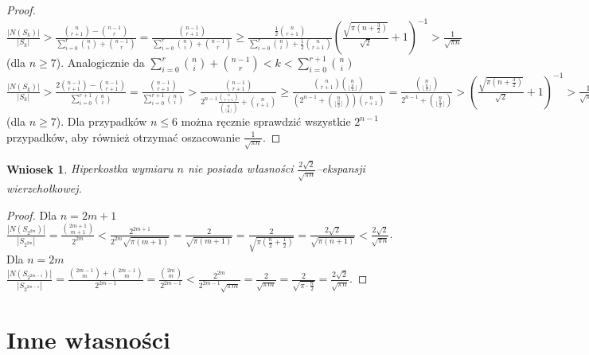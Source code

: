 \documentclass{pracamgr}
\newtheorem{corollary}[theorem]{Wniosek}
\begin{document}
\begin{proof}
    $\frac{|N(S_k)|}{|S_k|}>\frac{{n\choose r+1}-{n-1\choose r}}{\sum_{i=0}^{r}{n\choose i}+{n-1 \choose r}}=
    \frac{{n-1\choose r+1}}{\sum_{i=0}^{r}{n\choose i}+{n-1 \choose r}}\ge
    \frac{\frac{1}{2}{n \choose r+1}}{\sum_{i=0}^{r}{n\choose i}+\frac{1}{2}{n \choose r+1}}
    \left(\frac{\sqrt{\pi (n+\frac{3}{2})}}{\sqrt{2}}+1\right)^{-1}>\frac{1}{\sqrt{\pi n}}$ (dla $n\ge 7$).\newline
    Analogicznie da $\sum_{i=0}^{r}{n\choose i}+{n-1 \choose r}<k<\sum_{i=0}^{r+1}{n\choose i}$\newline
    $\frac{|N(S_k)|}{|S_k|}>\frac{2{n-1\choose r+1}-{n-1\choose r+1}}{\sum_{i=0}^{r+1}{n\choose i}}=
    \frac{{n-1\choose r+1}}{\sum_{i=0}^{r+1}{n\choose i}}>
    \frac{{n-1\choose r+1}}{2^{n-1}\frac{{n\choose r+1}}{{n\choose\lfloor\frac{n}{2}\rfloor}}+{n\choose r+1}}\ge
    \frac{{n\choose r+1}{n\choose\lfloor\frac{n}{2}\rfloor}}{(2^{n-1}+{n\choose\lfloor\frac{n}{2}\rfloor}){n\choose r+1}}=
    \frac{{n\choose\lfloor\frac{n}{2}\rfloor}}{2^{n-1}+{n\choose\lfloor\frac{n}{2}\rfloor}}>
    \left(\frac{\sqrt{\pi (n+\frac{3}{2})}}{\sqrt{2}}+1\right)^{-1}>\frac{1}{\sqrt{\pi n}}$ (dla $n\ge 7$).\newline
    Dla przypadków $n\le6$ można ręcznie sprawdzić wszystkie $2^{n-1}$ przypadków, aby również otrzymać oszacowanie $\frac{1}{\sqrt{\pi n}}$.
   \end{proof}
   \begin{corollary}\label{ograniczenie ekspansji}
    Hiperkostka wymiaru $n$ nie posiada własności $\frac{2\sqrt{2}}{\sqrt{\pi n}}$--ekspansji wierzchołkowej.
   \end{corollary}
   \begin{proof}
    Dla $n=2m+1$\newline
    $\frac{|N(S_{2^{2m}})|}{|S_{2^{2m}}|}=\frac{{2m+1 \choose m+1}}{2^{2m}}<\frac{2^{2m+1}}{2^{2m}\sqrt{\pi(m+1)}}=\frac{2}{\sqrt{\pi(m+1)}}=
    \frac{2}{\sqrt{\pi(\frac{n}{2}+\frac{1}{2})}}=\frac{2\sqrt{2}}{\sqrt{\pi(n+1)}}<\frac{2\sqrt{2}}{\sqrt{\pi n}}$.\newline
    Dla $n=2m$
    $\frac{|N(S_{2^{2m-1}})|}{|S_{2^{2m-1}}|}=\frac{{2m-1 \choose m}+{2m-1\choose m}}{2^{2m-1}}=\frac{{2m \choose m}}{2^{2m-1}}<
    \frac{2^{2m}}{2^{2m-1}\sqrt{\pi m}}=\frac{2}{\sqrt{\pi m}}=\frac{2}{\sqrt{\pi\cdot\frac{n}{2}}}=\frac{2\sqrt{2}}{\sqrt{\pi n}}$.
   \end{proof}
  \section{Inne własności}
\end{document}

